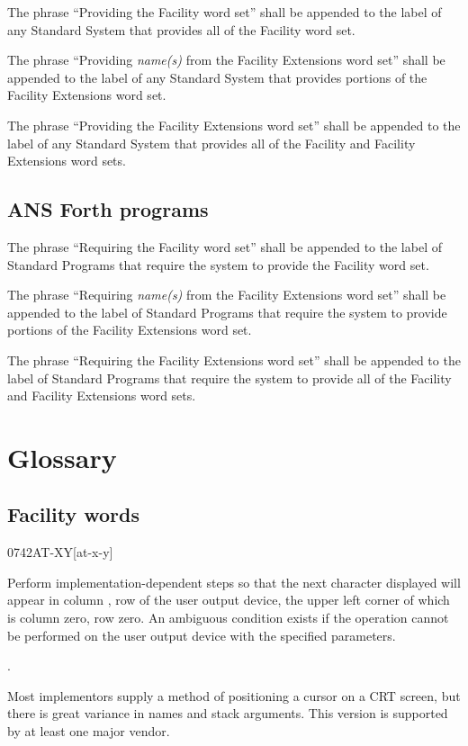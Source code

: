 The phrase ``Providing the Facility word set'' shall be appended to
the label of any Standard System that provides all of the Facility
word set.

The phrase ``Providing \emph{name(s)} from the Facility Extensions
word set'' shall be appended to the label of any Standard System
that provides portions of the Facility Extensions word set.

The phrase ``Providing the Facility Extensions word set'' shall be
appended to the label of any Standard System that provides all of
the Facility and Facility Extensions word sets.

\subsection{ANS Forth programs} %

The phrase ``Requiring the Facility word set'' shall be appended to
the label of Standard Programs that require the system to provide
the Facility word set.

The phrase ``Requiring \emph{name(s)} from the Facility Extensions
word set'' shall be appended to the label of Standard Programs that
require the system to provide portions of the Facility Extensions
word set.

The phrase ``Requiring the Facility Extensions word set'' shall be
appended to the label of Standard Programs that require the system
to provide all of the Facility and Facility Extensions word sets.

\section{Glossary} %

\subsection{Facility words} %

\begin{worddef}{0742}{AT-XY}[at-x-y]
\item {}

	Perform implementation-dependent steps so that the next
	character displayed will appear in column , row
	 of the user output device, the upper left corner
	of which is column zero, row zero. An ambiguous condition exists
	if the operation cannot be performed on the user output device
	with the specified parameters.

\see {}.

	\begin{rationale} %
		Most implementors supply a method of positioning a cursor on
		a CRT screen, but there is great variance in names and stack
		arguments. This version is supported by at least one major
		vendor.
	\end{rationale}
\end{worddef}



